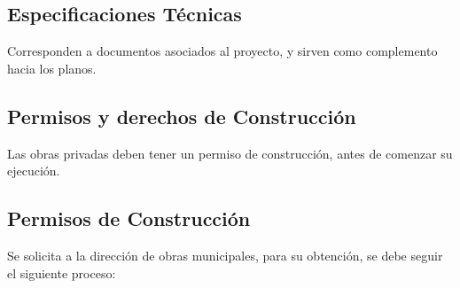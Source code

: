 \documentclass{article} %
\begin{document}
\subsection{Especificaciones Técnicas}

Corresponden a documentos asociados al proyecto, y sirven como complemento hacia los planos.

\subsection{Permisos y derechos de Construcción}

Las obras privadas deben tener un permiso de construcción, antes de comenzar su ejecución.

\subsection{Permisos de Construcción}

Se solicita a la dirección de obras municipales, para su obtención, se debe seguir el siguiente proceso:
\end{document}
